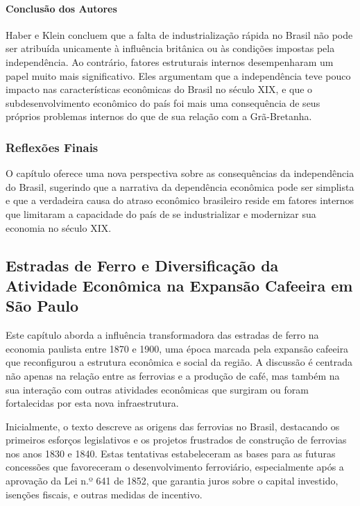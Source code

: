 \documentclass[a4paper,12pt]{article}[abntex2]
\begin{document}
\paragraph*{Conclusão dos Autores}
Haber e Klein concluem que a falta de industrialização rápida no Brasil não pode ser atribuída unicamente à influência britânica ou às condições impostas pela independência. Ao contrário, fatores estruturais internos desempenharam um papel muito mais significativo. Eles argumentam que a independência teve pouco impacto nas características econômicas do Brasil no século XIX, e que o subdesenvolvimento econômico do país foi mais uma consequência de seus próprios problemas internos do que de sua relação com a Grã-Bretanha.

\subsubsection*{Reflexões Finais}
O capítulo oferece uma nova perspectiva sobre as consequências da independência do Brasil, sugerindo que a narrativa da dependência econômica pode ser simplista e que a verdadeira causa do atraso econômico brasileiro reside em fatores internos que limitaram a capacidade do país de se industrializar e modernizar sua economia no século XIX.

\newpage
\subsection{\textbf{Estradas de Ferro e Diversificação da Atividade Econômica na Expansão Cafeeira em São Paulo}}

Este capítulo aborda a influência transformadora das estradas de ferro na economia paulista entre 1870 e 1900, uma época marcada pela expansão cafeeira que reconfigurou a estrutura econômica e social da região. A discussão é centrada não apenas na relação entre as ferrovias e a produção de café, mas também na sua interação com outras atividades econômicas que surgiram ou foram fortalecidas por esta nova infraestrutura.

Inicialmente, o texto descreve as origens das ferrovias no Brasil, destacando os primeiros esforços legislativos e os projetos frustrados de construção de ferrovias nos anos 1830 e 1840. Estas tentativas estabeleceram as bases para as futuras concessões que favoreceram o desenvolvimento ferroviário, especialmente após a aprovação da Lei n.º 641 de 1852, que garantia juros sobre o capital investido, isenções fiscais, e outras medidas de incentivo.
\end{document}
